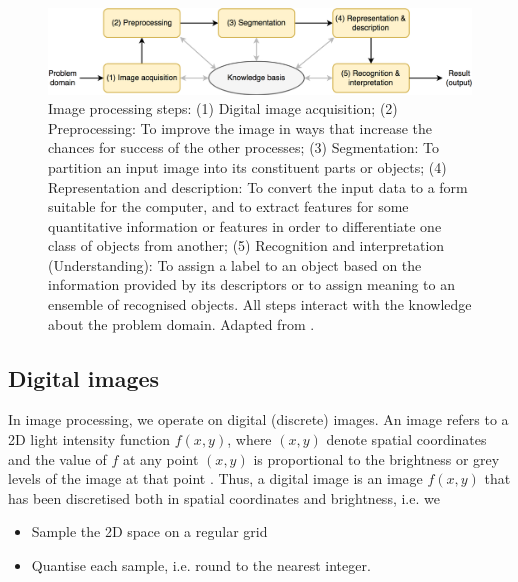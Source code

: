 \begin{figure}[H]
	\centering
	\includegraphics[width=\textwidth]{../Figures/imageprocessing.png}
	\caption{Image processing steps: (1) Digital image acquisition; (2) Preprocessing: To improve the image in ways that increase the chances for success of the other processes; (3) Segmentation: To partition an input image into its constituent parts or objects; (4) Representation and description: To convert the input data to a form suitable for the computer, and to extract features for some quantitative information or features in order to differentiate one class of objects from another;
	(5) Recognition and interpretation (Understanding): To assign a label to an object based on the information provided by its descriptors or to assign meaning to an ensemble of recognised objects. All steps interact with the knowledge about the problem domain. 
		Adapted from \cite{imagProcFundamentals}.}
	\label{fig:imageprocessingWorkflow}
\end{figure}



\subsection{Digital images}

In image processing, we operate on digital (discrete) images.
An image refers to a 2D light intensity function \( f(x,y) \), where \( (x,y) \) denote spatial coordinates and the value of \( f \) at any point \( (x,y) \) is proportional to the brightness or grey levels of the image at that point \cite{imagProcFundamentals}.
Thus, a digital image is an image \( f(x,y)  \) that has been discretised both in spatial coordinates and brightness, i.e. we
\begin{itemize}
	\item Sample the 2D space on a regular grid
	\item Quantise each sample, i.e. round to the nearest integer.
\end{itemize}

